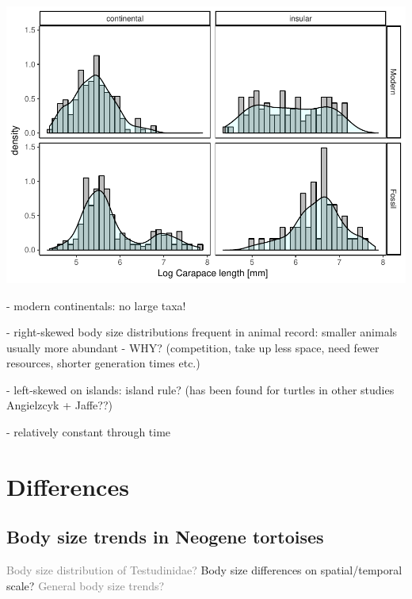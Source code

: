 \begin{frame}
\begin{center}
	\includegraphics[scale=0.45]{MA_JJ_files/figure-latex/HistFMCI-1.pdf}
\end{center}


- modern continentals: no large taxa!
\end{frame}


\begin{frame}
- right-skewed body size distributions frequent in animal record: smaller animals usually more abundant - WHY? (competition, take up less space, need fewer resources, shorter generation times etc.)

- left-skewed on islands: island rule?
(has been found for turtles in other studies \pf Angielzcyk + Jaffe??)

- relatively constant through time
\end{frame}




\section{Differences}

\subsection{Body size trends in Neogene tortoises}

\begin{frame}
\begin{enumerate}
	
	\p \textcolor{gray}{Body size distribution of Testudinidae?}
	\bigskip
	\p Body size differences on spatial/temporal scale?
	\bigskip
	\p \textcolor{gray}{General body size trends?}
\end{enumerate}
\end{frame}


